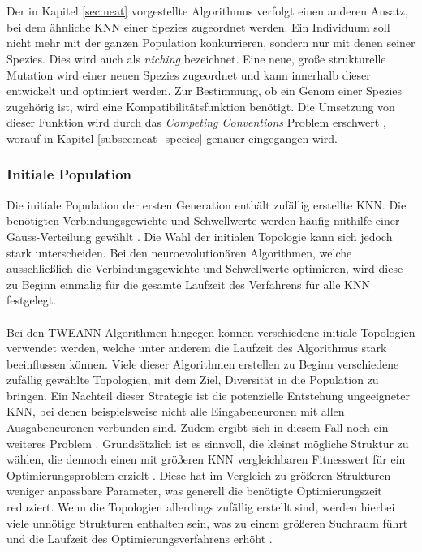 \\\\
Der in Kapitel \ref{sec:neat} vorgestellte Algorithmus verfolgt einen anderen Ansatz, bei dem ähnliche \ac{KNN} einer Spezies zugeordnet werden. Ein Individuum soll nicht mehr mit der ganzen Population konkurrieren, sondern nur mit denen seiner Spezies. Dies wird auch als \emph{niching} bezeichnet. Eine neue, große strukturelle Mutation wird einer neuen Spezies zugeordnet und kann innerhalb dieser entwickelt und optimiert werden. Zur Bestimmung, ob ein Genom einer Spezies zugehörig ist, wird eine Kompatibilitätsfunktion benötigt. Die Umsetzung von dieser Funktion wird durch das \emph{Competing Conventions} Problem erschwert \cite{stanley2002evolving}, worauf in Kapitel \ref{subsec:neat_species} genauer eingegangen wird.
 
\subsubsection{Initiale Population}
Die initiale Population der ersten Generation enthält zufällig erstellte \ac{KNN}. Die benötigten Verbindungsgewichte und Schwellwerte werden häufig mithilfe einer Gauss-Verteilung gewählt \cite{mcintyre_neatpython}. Die Wahl der initialen Topologie kann sich jedoch stark unterscheiden. Bei den neuroevolutionären Algorithmen, welche ausschließlich die Verbindungsgewichte und Schwellwerte optimieren, wird diese zu Beginn einmalig für die gesamte Laufzeit des Verfahrens für alle \ac{KNN} festgelegt.
\\\\
Bei den \ac{TWEANN} Algorithmen hingegen können verschiedene initiale Topologien verwendet werden, welche unter anderem die Laufzeit des Algorithmus stark beeinflussen können. Viele dieser Algorithmen erstellen zu Beginn verschiedene zufällig gewählte Topologien, mit dem Ziel, Diversität in die Population zu bringen. Ein Nachteil dieser Strategie ist die potenzielle Entstehung ungeeigneter \ac{KNN}, bei denen beispielsweise nicht alle Eingabeneuronen mit allen Ausgabeneuronen verbunden sind. Zudem ergibt sich in diesem Fall noch ein weiteres Problem \cite{stanley2002evolving}. Grundsätzlich ist es sinnvoll, die kleinst mögliche Struktur zu wählen, die dennoch einen mit größeren \ac{KNN} vergleichbaren Fitnesswert für ein Optimierungsproblem erzielt \cite{zhang1993evolving}. Diese hat im Vergleich zu größeren Strukturen weniger anpassbare Parameter, was generell die benötigte Optimierungszeit reduziert. Wenn die Topologien allerdings zufällig erstellt sind, werden hierbei viele unnötige Strukturen enthalten sein, was zu einem größeren Suchraum führt und die Laufzeit des Optimierungsverfahrens erhöht \cite{stanley2002evolving}. 
